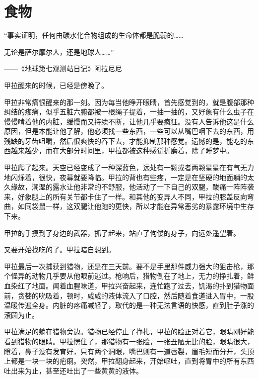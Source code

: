 \chapter{食物}

\begin{myquote}
“事实证明，任何由碳水化合物组成的生命体都是脆弱的……

无论是萨尔摩尔人，还是地球人……”
\end{myquote}

\begin{myflushright}
——《地球第七观测站日记》阿拉尼尼
\end{myflushright}

甲拉醒来的时候，已经是傍晚了。

甲拉非常痛恨醒来的那一刻。因为每当他睁开眼睛，首先感觉到的，就是腹部那种纠结的疼痛，似乎五脏六腑都被一根绳子提着，一抽一抽的，又好象有什么虫子在慢慢啃着他的内脏，缓慢而又持续不断，让他几乎要疯狂。没有人告诉他这是什么原因，但是本能让他了解，他必须找一些东西，一些可以从嘴巴咽下去的东西，用残缺的牙齿咀嚼，然后很爽快的吞下去，才能抑制那种感觉。遗憾的是，能吃的东西越来越少，而在大部分时间里，甲拉都被这种感觉折磨着，除了睡梦中。

甲拉爬了起来。天空已经变成了一种深蓝色，远处有一颗或者两颗星星在有气无力地闪烁着，很快，夜幕就要降临。甲拉的背也有些疼，一定是在坚硬的地面躺的太久缘故，潮湿的露水让他非常的不舒服，他活动了一下自己的双腿，酸痛一阵阵袭来，好象腿上的所有关节都卡住了一样。和其他的变异人不同，甲拉的膝盖反向弯曲，如同袋鼠一样，这双腿让他跑的更快，所以才能在异常恶劣的暴露环境中生存下来。

甲拉的手摸到了身边的武器，抓了起来，站直了佝偻的身子，向远处遥望着。

又要开始找吃的了。甲拉暗自想到。

甲拉最后一次捕获到猎物，还是在三天前。要不是手里那件威力强大的狙击枪，那个怪异的动物几乎要从他眼前逃过。枪响后，猎物倒在了地上，无力的挣扎着，鲜血染红了地面。闻着血腥味道，甲拉兴奋起来，连忙跑了过去，饥渴的扑到猎物面前，贪婪的吮吸着，顿时，咸咸的液体流入了口腔，然后随着食道进入胃中，一股温暖传遍全身。内脏的疼痛减轻了，取代的是一种无法言语的快感，直到肚子涨的滚圆为止。

甲拉满足的躺在猎物旁边。猎物已经停止了挣扎，甲拉的脸正对着它，眼睛刚好能看到猎物的眼睛。甲拉愣住了，那猎物有一张脸，一张丑陋无比的脸，眼睛很大，瞪着，鼻子没有发育好，只有两个洞眼，嘴巴则有一道唇裂，眉毛短而分开，头顶上都是一块一块的疤瘌。突然，甲拉翻身起来，开始呕吐，直到将胃中的所有东西吐出来为止，甚至还吐出了一些黄黄的液体。

